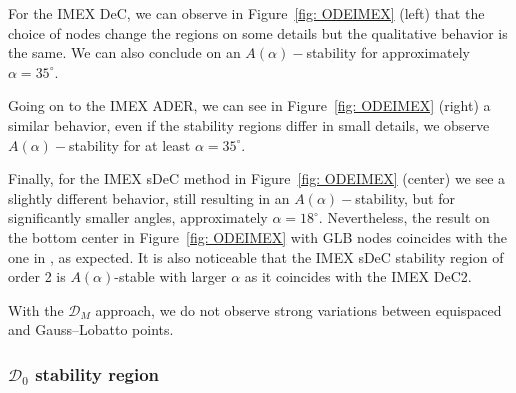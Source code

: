 For the IMEX DeC, we can observe in Figure~\ref{fig: ODEIMEX} (left) that the choice of nodes change the regions on some details but the qualitative behavior is the same. We can also conclude on an $A(\alpha)-$stability for approximately $\alpha=35^\circ$.

Going on to the IMEX ADER, we can see in Figure~\ref{fig: ODEIMEX} (right) a similar behavior, even if the stability regions differ in small details, we observe $A(\alpha)-$stability for at least $\alpha=35^\circ$.

Finally, for the IMEX sDeC method in Figure~\ref{fig: ODEIMEX} (center) we see a slightly different behavior, still resulting in an $A(\alpha)-$stability, but for significantly smaller angles, approximately $\alpha=18^\circ$. 
Nevertheless, the result on the bottom center in Figure~\ref{fig: ODEIMEX} with GLB nodes coincides with the one in \cite{minion2003dec}, as expected. 
It is also noticeable that the IMEX sDeC stability region of order 2 is $A(\alpha)$-stable with larger $\alpha$ as it coincides with the IMEX DeC2.

With the $\mathcal{D}_M$ approach, we do not observe strong variations between equispaced and Gauss--Lobatto points.


\subsubsection*{$\mathcal{D}_0$ stability region}

